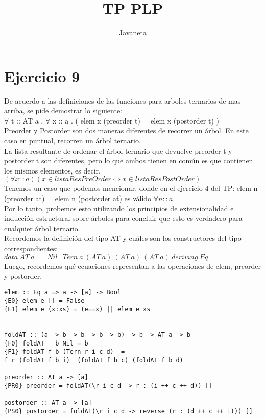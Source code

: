 \documentclass{article}
\title{TP PLP}
\author{Javaneta}
\begin{document}
\newcommand{\streq}[1]{\stackrel{\text{#1}}{=}}

\maketitle

\section{Ejercicio 9}
De acuerdo a las definiciones de las funciones para arboles ternarios de mas arriba, se pide
demostrar lo siguiente:\\
$\forall$ t :: AT a . $\forall$ x :: a . ( elem x (preorder t) = elem x (postorder t) ) \\

Preorder y Postorder son dos maneras diferentes de recorrer un árbol. En este caso en puntual, recorren un árbol ternario.  \\

La lista resultante de ordenar el árbol ternario que devuelve preorder t y postorder t son diferentes, pero lo que ambos tienen en común es que contienen los mismos elementos, es decir, $(\forall x::a) (x \in listaResPreOrder \iff x \in listaResPostOrder)$ \\
Tenemos un caso que podemos mencionar, donde en el ejercicio 4 del TP: elem n (preorder at) = elem n (postorder at) es válido $\forall n::a$ \\

Por lo tanto, probemos esto utilizando los principios de extensionalidad e inducción estructural sobre árboles para concluir que esto es verdadero para cualquier árbol ternario.  \\

Recordemos la definición del tipo AT y cuáles son los constructores del tipo correspondientes: $ data \ AT \ a \ = \ Nil \ | \ Tern \ a \ (AT \ a) \ (AT \ a) \ (AT \ a) \ deriving \ Eq$ \\

Luego, recordemos qué ecuaciones representan a las operaciones de elem, preorder y postorder. 

\begin{lstlisting}
elem :: Eq a => a -> [a] -> Bool
{E0} elem e [] = False
{E1} elem e (x:xs) = (e==x) || elem e xs


foldAT :: (a -> b -> b -> b -> b) -> b -> AT a -> b 
{F0} foldAT _ b Nil = b 
{F1} foldAT f b (Tern r i c d)  = 
f r (foldAT f b i)  (foldAT f b c) (foldAT f b d)

preorder :: AT a -> [a]
{PR0} preorder = foldAT(\r i c d -> r : (i ++ c ++ d)) []

postorder :: AT a -> [a]
{PS0} postorder = foldAT(\r i c d -> reverse (r : (d ++ c ++ i))) []
\end{lstlisting}
\end{document}
